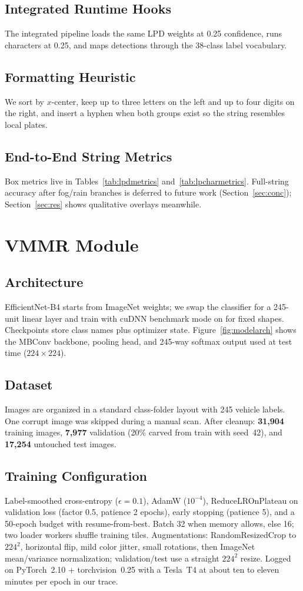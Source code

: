 \documentclass[10pt, conference]{IEEEtran}
\begin{document}
\subsection{Integrated Runtime Hooks}
The integrated pipeline loads the same LPD weights at 0.25 confidence, runs characters at 0.25, and maps detections through the 38-class label vocabulary.

\subsection{Formatting Heuristic}
We sort by $x$-center, keep up to three letters on the left and up to four digits on the right, and insert a hyphen when both groups exist so the string resembles local plates.

\subsection{End-to-End String Metrics}
Box metrics live in Tables~\ref{tab:lpdmetrics} and~\ref{tab:lpcharmetrics}. Full-string accuracy after fog/rain branches is deferred to future work (Section~\ref{sec:conc}); Section~\ref{sec:res} shows qualitative overlays meanwhile.

\section{VMMR Module}
\label{sec:vmmr}
\subsection{Architecture}
EfficientNet-B4 starts from ImageNet weights; we swap the classifier for a 245-unit linear layer and train with cuDNN benchmark mode on for fixed shapes. Checkpoints store class names plus optimizer state. Figure~\ref{fig:modelarch} shows the MBConv backbone, pooling head, and 245-way softmax output used at test time ($224\times224$).

\subsection{Dataset}
Images are organized in a standard class-folder layout with 245 vehicle labels. One corrupt image was skipped during a manual scan. After cleanup: \textbf{31{,}904} training images, \textbf{7{,}977} validation (20\% carved from train with seed~42), and \textbf{17{,}254} untouched test images.

\subsection{Training Configuration}
Label-smoothed cross-entropy ($\epsilon=0.1$), AdamW ($10^{-4}$), ReduceLROnPlateau on validation loss (factor 0.5, patience 2 epochs), early stopping (patience 5), and a 50-epoch budget with resume-from-best. Batch 32 when memory allows, else 16; two loader workers shuffle training tiles. Augmentations: RandomResizedCrop to $224^2$, horizontal flip, mild color jitter, small rotations, then ImageNet mean/variance normalization; validation/test use a straight $224^2$ resize. Logged on PyTorch~2.10 + torchvision~0.25 with a Tesla~T4 at about ten to eleven minutes per epoch in our trace.
\end{document}
